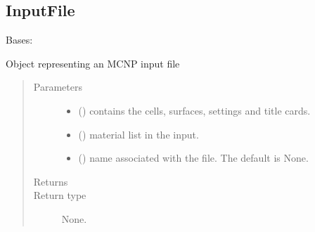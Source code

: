 \documentclass[letterpaper,10pt,english]{sphinxmanual}
\begin{document}
\subsection{InputFile}
\label{\detokenize{api/inputgeneration:inputfile}}\label{\detokenize{api/inputgeneration:inputob}}

\begin{fulllineitems}
\label{\detokenize{api/inputgeneration:inputfile.InputFile}}
Bases: 

Object representing an MCNP input file
\begin{quote}\begin{description}
\item[{Parameters}] \leavevmode\begin{itemize}
\item {} 
 () \textendash{} contains the cells, surfaces, settings and title cards.

\item {} 
 () \textendash{} material list in the input.

\item {} 
 (\sphinxstyleliteralemphasis{\sphinxupquote{, }}) \textendash{} name associated with the file. The default is None.

\end{itemize}

\item[{Returns}] \leavevmode


\item[{Return type}] \leavevmode
None.

\end{description}\end{quote}


\end{fulllineitems}
\end{document}
